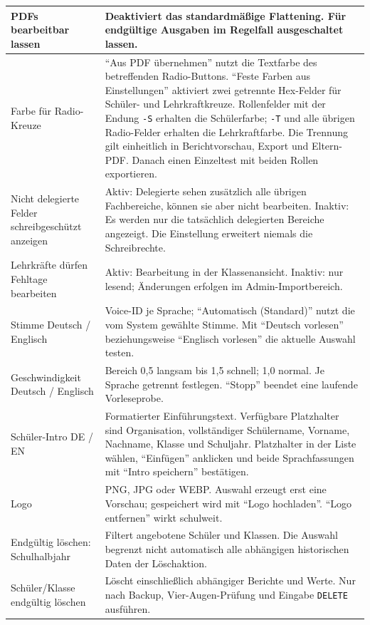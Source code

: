 \documentclass[12pt,a4paper]{article}
\begin{document}
\begin{longtable}{|p{}|p{}|}
\hline
PDFs bearbeitbar lassen & Deaktiviert das standardmäßige Flattening. Für endgültige Ausgaben im Regelfall ausgeschaltet lassen.\\
\hline
Farbe für Radio-Kreuze & \enquote{Aus PDF übernehmen} nutzt die Textfarbe des betreffenden Radio-Buttons. \enquote{Feste Farben aus Einstellungen} aktiviert zwei getrennte Hex-Felder für Schüler- und Lehrkraftkreuze. Rollenfelder mit der Endung \texttt{-S} erhalten die Schülerfarbe; \texttt{-T} und alle übrigen Radio-Felder erhalten die Lehrkraftfarbe. Die Trennung gilt einheitlich in Berichtvorschau, Export und Eltern-PDF. Danach einen Einzeltest mit beiden Rollen exportieren.\\
\hline
Nicht delegierte Felder schreibgeschützt anzeigen & Aktiv: Delegierte sehen zusätzlich alle übrigen Fachbereiche, können sie aber nicht bearbeiten. Inaktiv: Es werden nur die tatsächlich delegierten Bereiche angezeigt. Die Einstellung erweitert niemals die Schreibrechte.\\
\hline
Lehrkräfte dürfen Fehltage bearbeiten & Aktiv: Bearbeitung in der Klassenansicht. Inaktiv: nur lesend; Änderungen erfolgen im Admin-Importbereich.\\
\hline
Stimme Deutsch / Englisch & Voice-ID je Sprache; \enquote{Automatisch (Standard)} nutzt die vom System gewählte Stimme. Mit \enquote{Deutsch vorlesen} beziehungsweise \enquote{Englisch vorlesen} die aktuelle Auswahl testen.\\
\hline
Geschwindigkeit Deutsch / Englisch & Bereich 0,5 langsam bis 1,5 schnell; 1,0 normal. Je Sprache getrennt festlegen. \enquote{Stopp} beendet eine laufende Vorleseprobe.\\
\hline
Schüler-Intro DE / EN & Formatierter Einführungstext. Verfügbare Platzhalter sind Organisation, vollständiger Schülername, Vorname, Nachname, Klasse und Schuljahr. Platzhalter in der Liste wählen, \enquote{Einfügen} anklicken und beide Sprachfassungen mit \enquote{Intro speichern} bestätigen.\\
\hline
Logo & PNG, JPG oder WEBP. Auswahl erzeugt erst eine Vorschau; gespeichert wird mit \enquote{Logo hochladen}. \enquote{Logo entfernen} wirkt schulweit.\\
\hline
Endgültig löschen: Schulhalbjahr & Filtert angebotene Schüler und Klassen. Die Auswahl begrenzt nicht automatisch alle abhängigen historischen Daten der Löschaktion.\\
\hline
Schüler/Klasse endgültig löschen & Löscht einschließlich abhängiger Berichte und Werte. Nur nach Backup, Vier-Augen-Prüfung und Eingabe \texttt{DELETE} ausführen.\\
\hline
\end{longtable}
\normalsize
\end{document}
